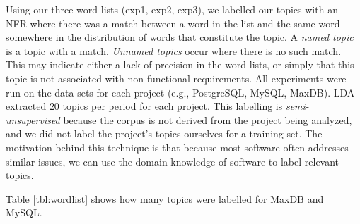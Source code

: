 \documentclass[smallextended]{svjour3}       %
\begin{document}
Using our three word-lists (\textsf{exp1}, \textsf{exp2}, \textsf{exp3}), we labelled our topics with an NFR where there was a match between a word in
the list and the same word somewhere in the distribution of words that constitute the topic.
A \emph{named topic} is a topic with a match. 
\emph{Unnamed topics} occur where there is no such match. 
This may indicate either a lack of precision in the word-lists, or simply that this topic is not associated with non-functional
requirements.
All experiments were run on the data-sets for each project (e.g., PostgreSQL, MySQL, MaxDB). LDA
extracted $20$ topics per period for each project.
This labelling is \emph{semi-unsupervised} because the corpus is not derived from 
the project being analyzed, and we did not label the project's topics
ourselves for a training set. The motivation behind this technique is that
because most software often addresses similar issues, we can use the 
domain knowledge of software to label relevant topics.


Table \ref{tbl:wordlist} shows how many topics were labelled for MaxDB
and MySQL.
\end{document}
